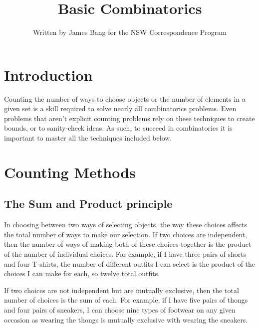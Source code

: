 \documentclass[12pt]{article}
\title{Basic Combinatorics}
\author{Written by James Bang for the NSW Correspondence Program}
\begin{document}
\maketitle

\section{Introduction}
Counting the number of ways to choose objects or the number of elements in a given set is a skill required to solve nearly all combinatorics problems. Even problems that aren't explicit counting problems rely on these techniques to create bounds, or to sanity-check ideas. As such, to succeed in combinatorics it is important to master all the techniques included below.
\section{Counting Methods}
\subsection{The Sum and Product principle}
In choosing between two ways of selecting objects, the way these choices affects the total number of ways to make our selection. If two choices are independent, then the number of ways of making both of these choices together is the product of the number of individual choices. For example, if I have three pairs of shorts and four T-shirts, the number of different outfits I can select is the product of the choices I can make for each, so twelve total outfits.

\vspace{2mm}

\noindent If two choices are not independent but are mutually exclusive, then the total number of choices is the sum of each. For example, if I have five pairs of thongs and four pairs of sneakers, I can choose nine types of footwear on any given occasion as wearing the thongs is mutually exclusive with wearing the sneakers.
\end{document}
